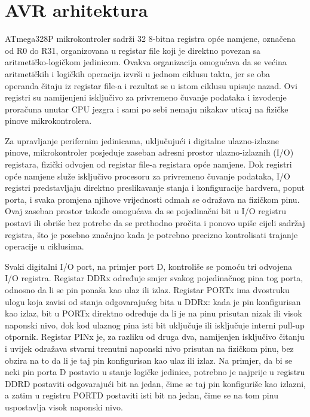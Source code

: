 \section{AVR arhitektura}
\label{sec:avr}
%
ATmega328P mikrokontroler sadrži 32 8-bitna registra opće namjene, označena od R0 do R31,
organizovana u registar
\foreignlanguage{english}{file} koji je direktno povezan sa
aritmetičko-logičkom jedinicom. Ovakva organizacija omogućava da se
većina aritmetičkih i logičkih operacija izvrši u jednom ciklusu takta,
jer se oba operanda čitaju iz registar \foreignlanguage{english}{file}-a
i rezultat se u istom ciklusu upisuje nazad. Ovi registri su namijenjeni
isključivo za privremeno čuvanje podataka i izvođenje proračuna unutar
CPU jezgra i sami po sebi nemaju nikakav uticaj na fizičke pinove
mikrokontrolera.

Za upravljanje perifernim jedinicama, uključujući i digitalne ulazno-izlazne
pinove, mikrokontroler posjeduje zaseban adresni prostor
ulazno-izlaznih (I/O) registara, fizički odvojen od registar
\foreignlanguage{english}{file}-a registara opće namjene. Dok registri
opće namjene služe isključivo procesoru za privremeno čuvanje podataka,
I/O registri predstavljaju direktno preslikavanje stanja i konfiguracije
hardvera, poput porta, i svaka promjena njihove vrijednosti odmah se
odražava na fizičkom pinu. Ovaj zaseban prostor takođe omogućava da se
pojedinačni bit u I/O registru postavi ili obriše bez potrebe da se
prethodno pročita i ponovo upiše cijeli sadržaj registra, što je posebno
značajno kada je potrebno precizno kontrolisati trajanje operacije u
ciklusima.

Svaki digitalni I/O port, na primjer port D, kontroliše se pomoću tri
odvojena I/O registra. Registar DDRx određuje smjer svakog pojedinačnog
pina tog porta, odnosno da li se pin ponaša kao ulaz ili izlaz. Registar
PORTx ima dvostruku ulogu koja zavisi od stanja odgovarajućeg bita u
DDRx: kada je pin konfigurisan kao izlaz, bit u PORTx direktno određuje
da li je na pinu prisutan nizak ili visok naponski nivo, dok kod
ulaznog pina isti bit uključuje ili isključuje interni pull-up otpornik.
Registar PINx je, za razliku od druga dva, namijenjen isključivo čitanju
i uvijek odražava stvarni trenutni naponski nivo prisutan na fizičkom
pinu, bez obzira na to da li je taj pin konfigurisan kao ulaz ili izlaz.
Na primjer, da bi se neki pin porta D postavio u stanje logičke
jedinice, potrebno je najprije u registru DDRD postaviti odgovarajući
bit na jedan, čime se taj pin konfiguriše kao izlazni, a zatim u
registru PORTD postaviti isti bit na jedan, čime se na tom pinu
uspostavlja visok naponski nivo.

